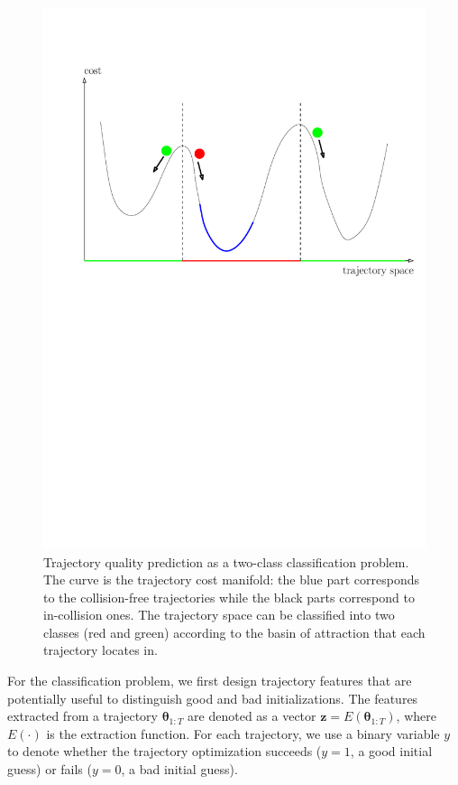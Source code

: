 \documentclass[letterpaper, 10 pt, conference]{ieeeconf}  %
\newcommand{\btheta}{\mbox{$\bm \theta$}}
\newcommand{\fsym}{\mbox{$\mathbf z$}}
\begin{document}
\begin{figure}[!h]
\centering
\includegraphics[width=\linewidth]{figure/overview.pdf}
\caption{Trajectory quality prediction as a two-class classification problem. The curve is the trajectory cost manifold: the blue part corresponds to the collision-free trajectories while the black parts correspond to in-collision ones. The trajectory space can be classified into two classes (red and green) according to the basin of attraction that each trajectory locates in. }
\label{fig:overview}
\end{figure}

For the classification problem, we first design trajectory features that are potentially useful to distinguish good and bad initializations. The features extracted from a trajectory $\btheta_{1:T}$ are denoted as a vector $\fsym = E(\btheta_{1:T})$, where $E(\cdot)$ is the extraction function. For each trajectory, we use a binary variable $y$ to denote whether the trajectory optimization succeeds ($y = 1$, a good initial guess) or fails ($y = 0$, a bad initial guess). 
\end{document}

